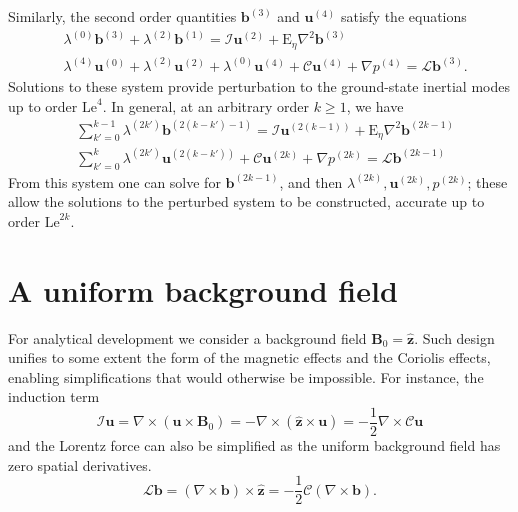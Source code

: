 Similarly, the second order quantities $\mathbf{b}^{(3)}$ and $\mathbf{u}^{(4)}$ satisfy the equations 
%
\begin{equation}
    \begin{aligned}
        &\lambda^{(0)} \mathbf{b}^{(3)} + \lambda^{(2)} \mathbf{b}^{(1)} = \mathcal{I} \mathbf{u}^{(2)} + \mathrm{E}_\eta \nabla^2 \mathbf{b}^{(3)} \\
        &\lambda^{(4)} \mathbf{u}^{(0)} + \lambda^{(2)} \mathbf{u}^{(2)} + \lambda^{(0)} \mathbf{u}^{(4)} + \mathcal{C} \mathbf{u}^{(4)} + \nabla p^{(4)} = \mathcal{L} \mathbf{b}^{(3)}.
    \end{aligned}
\end{equation}
%
Solutions to these system provide perturbation to the ground-state inertial modes up to order $\mathrm{Le}^4$. In general, at an arbitrary order $k \geq 1$, we have
%
\begin{equation}\label{perturb-sys-arb-k}
\begin{aligned}
    & \sum_{k'=0}^{k-1} \lambda^{(2k')} \mathbf{b}^{(2(k-k')-1)} = \mathcal{I} \mathbf{u}^{(2(k-1))} + \mathrm{E}_\eta \nabla^2 \mathbf{b}^{(2k-1)} \\
    & \sum_{k'=0}^k \lambda^{(2k')} \mathbf{u}^{(2(k-k'))} + \mathcal{C} \mathbf{u}^{(2k)} + \nabla p^{(2k)} = \mathcal{L} \mathbf{b}^{(2k-1)}
\end{aligned}
\end{equation}
%
From this system one can solve for $\mathbf{b}^{(2k-1)}$, and then $\lambda^{(2k)}, \mathbf{u}^{(2k)}, p^{(2k)}$; these allow the solutions to the perturbed system to be constructed, accurate up to order $\mathrm{Le}^{2k}$.


\section{A uniform background field}

For analytical development we consider a background field $\mathbf{B}_0 = \hat{\mathbf{z}}$. Such design unifies to some extent the form of the magnetic effects and the Coriolis effects, enabling simplifications that would otherwise be impossible. For instance, the induction term
%
\begin{equation}
    \mathcal{I} \mathbf{u} = \nabla\times (\mathbf{u}\times \mathbf{B}_0) = -\nabla\times (\hat{\mathbf{z}}\times \mathbf{u}) = - \frac{1}{2} \nabla\times \mathcal{C} \mathbf{u}
\end{equation}
%
and the Lorentz force can also be simplified as the uniform background field has zero spatial derivatives.
%
\begin{equation}
    \mathcal{L} \mathbf{b} = (\nabla\times \mathbf{b})\times \hat{\mathbf{z}} = - \frac{1}{2} \mathcal{C} (\nabla\times \mathbf{b}).
\end{equation}
%


